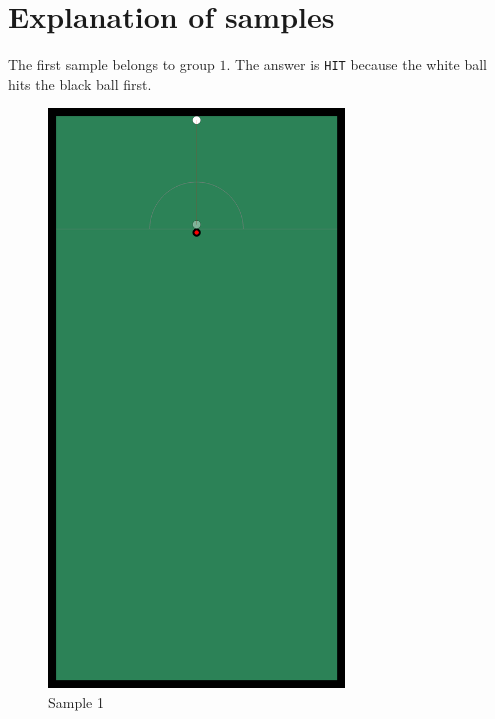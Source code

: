 \section*{Explanation of samples}
The first sample belongs to group $1$. The answer is \texttt{HIT} because the white ball hits the black ball first.
\begin{figure}[ht!]
  \centering
    \includegraphics[width=0.7\textwidth]{sample1}
  \caption{Sample 1}
\end{figure}

